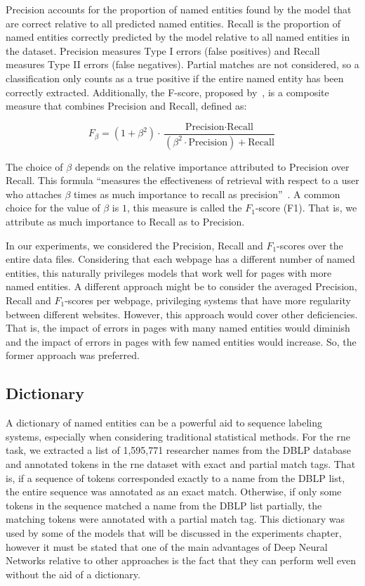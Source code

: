 \documentclass{nle}
\begin{document}
Precision accounts for the proportion of named entities found by the model that are 
correct relative to all predicted named entities.
Recall is the proportion of named entities correctly predicted by the model relative to
all named entities in the dataset. Precision measures Type I errors 
(false positives) and Recall measures Type II errors (false negatives). Partial matches are
not considered, so a classification only counts as a true positive if the entire named entity
has been correctly extracted. Additionally, the F-score, proposed by~\cite{Rijsbergen1979}, 
is a composite measure that combines Precision and Recall, defined as:

\begin{equation}
F_{\beta} = (1 + \beta^2) \cdot \frac{\text{Precision} \cdot \text{Recall}}{(\beta^2 \cdot \text{Precision}) + \text{Recall}}
\label{eq:fscore_formula}
\end{equation}

The choice of $ \beta $ depends on the relative importance attributed to Precision over Recall.
This formula ``measures the effectiveness of retrieval with respect to a user who attaches 
$ \beta$ times as much importance to recall as precision''~\cite{Rijsbergen1979}. A common choice
for the value of $ \beta $ is $ 1 $, this measure is called the $ F_1 $-score (F1). That is, we attribute 
as much importance to Recall as to Precision.

In our experiments, we considered the Precision, Recall and $ F_1 $-scores over the entire 
data files. Considering that each webpage has a different number of named entities,
this naturally privileges models that work well for pages with more named entities. 
A different approach might be to consider the averaged Precision, Recall and $ F_1 $-scores 
per webpage, privileging systems that have more regularity between different websites. However, 
this approach would cover other deficiencies. That is, the impact of errors in pages with many 
named entities would diminish and the impact of errors in pages with few named entities would
increase. So, the former approach was preferred.


\subsection{Dictionary}
\label{sec:dictionary}

A dictionary of named entities can be a powerful aid to sequence labeling systems,
especially when considering traditional statistical methods. For the \gls{rne} task, we extracted 
a list of 1,595,771 researcher names from the DBLP database and annotated tokens in the
\gls{rne} dataset with exact and partial match tags. That is, if a sequence of tokens
corresponded exactly to a name from the DBLP list, the entire sequence was annotated as 
an exact match. Otherwise, if only some tokens in the sequence matched a name from the DBLP
list partially, the matching tokens were annotated with a partial match tag. This dictionary
was used by some of the models that will be discussed in the experiments chapter, however it 
must be stated that one of the main advantages of Deep Neural Networks relative to other
approaches is the fact that they can perform well even without the aid of a dictionary.
\end{document}
